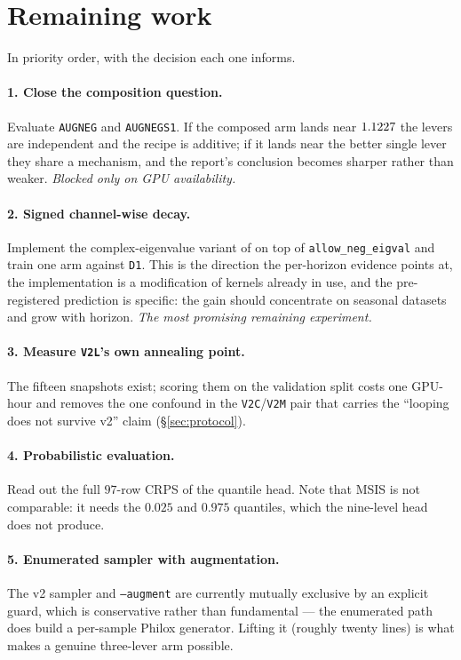 \section{Remaining work}
\label{sec:remaining}

In priority order, with the decision each one informs.

\paragraph{1. Close the composition question.} Evaluate \texttt{AUGNEG} and
\texttt{AUGNEGS1}. If the composed arm lands near $1.1227$ the
levers are independent and the recipe is additive; if it lands near the better
single lever they share a mechanism, and the report's conclusion becomes
sharper rather than weaker. \emph{Blocked only on GPU availability.}

\paragraph{2. Signed channel-wise decay.} Implement the complex-eigenvalue
variant of \citet{ckda2026} on top of \texttt{allow\_neg\_eigval} and train one
arm against \texttt{D1}. This is the direction the per-horizon evidence points
at, the implementation is a modification of kernels already in use, and the
pre-registered prediction is specific: the gain should concentrate on seasonal
datasets and grow with horizon. \emph{The most promising remaining experiment.}

\paragraph{3. Measure \texttt{V2L}'s own annealing point.} The fifteen
snapshots exist; scoring them on the validation split costs one GPU-hour and
removes the one confound in the \texttt{V2C}/\texttt{V2M} pair that carries the
``looping does not survive v2'' claim (\S\ref{sec:protocol}).

\paragraph{4. Probabilistic evaluation.} Read out the full $97$-row CRPS of the
quantile head. Note that MSIS is not comparable: it needs the $0.025$ and
$0.975$ quantiles, which the nine-level head does not produce.

\paragraph{5. Enumerated sampler with augmentation.} The v2 sampler and
\texttt{--augment} are currently mutually exclusive by an explicit guard, which
is conservative rather than fundamental --- the enumerated path does build a
per-sample Philox generator. Lifting it (roughly twenty lines) is what makes a
genuine three-lever arm possible.

